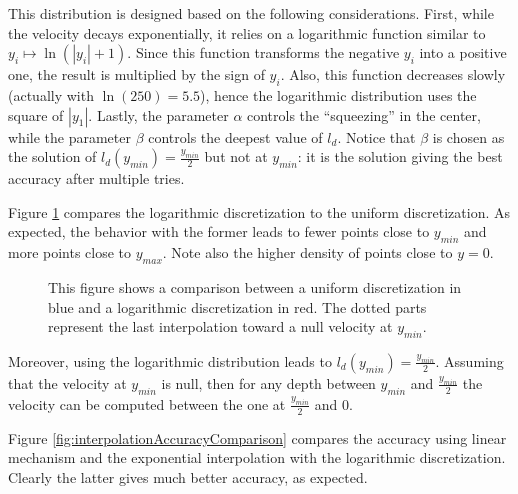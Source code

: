 \documentclass[final]{jcgt}
\begin{document}
This distribution is designed based on the following considerations.
First, while the velocity decays exponentially, it relies on a logarithmic function similar to $y_i\mapsto \ln(|y_i|+1)$.
Since this function transforms the negative $y_i$ into a positive one, the result is multiplied by the sign of $y_i$.
Also, this function decreases slowly (actually with $\ln(250)=5.5$), hence the logarithmic distribution uses the square of $|y_1|$.
Lastly, the parameter $\alpha$ controls the “squeezing” in the center, while the parameter $\beta$ controls the deepest value of $l_d$.
Notice that $\beta$ is chosen as the solution of $l_d(y_{min})=\frac{y_{min}}{2}$ but not at $y_{min}$: it is the solution giving the best accuracy after multiple tries.

Figure \ref{fig:comparisonGrid} compares the logarithmic discretization to the uniform discretization. As expected, the behavior with the former leads to fewer points close to $y_{min}$ and more points close to $y_{max}$.
Note also the higher density of points close to $y=0$.

\begin{figure}[ht]
	\centering
	\hfill
	\caption{This figure shows a comparison between a \textcolor{bleuF}{uniform discretization in blue} and a \textcolor{redF}{logarithmic discretization in red}. The dotted parts represent the last interpolation toward a null velocity at $y_{min}$.}
	\label{fig:comparisonGrid}
\end{figure}

Moreover, using the logarithmic distribution leads to $l_d(y_{min})=\frac{y_{min}}{2}$.
Assuming that the velocity at $y_{min}$ is null, then for any depth between $y_{min}$ and $\frac{y_{min}}{2}$ the velocity can be computed between the one at $\frac{y_{min}}{2}$ and $0$.

Figure \ref{fig:interpolationAccuracyComparison} compares the accuracy using linear mechanism and the exponential interpolation with the logarithmic discretization.
Clearly the latter gives much better accuracy, as expected.
\end{document}
